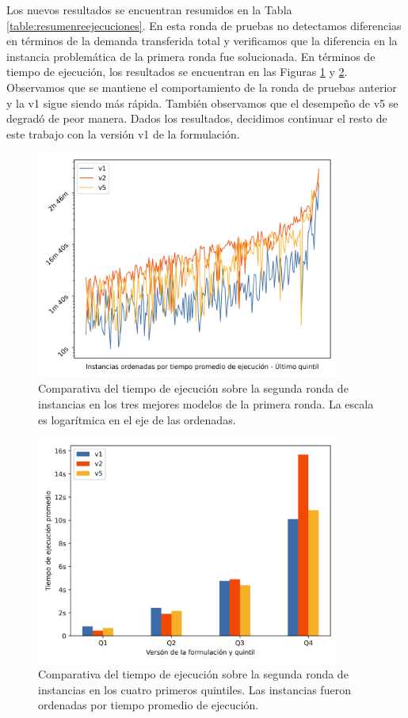 Los nuevos resultados se encuentran resumidos en la Tabla \ref{table:resumenreejecuciones}. En esta ronda de pruebas no detectamos diferencias en términos de la demanda transferida total y verificamos que la diferencia en la instancia problemática de la primera ronda fue solucionada. En términos de tiempo de ejecución, los resultados se encuentran en las Figuras \ref{fig:runtimecomparisonrerun} y \ref{fig:firstfourquintilesrerun}. Observamos que se mantiene el comportamiento de la ronda de pruebas anterior y la v1 sigue siendo más rápida. También observamos que el desempeño de v5 se degradó de peor manera. Dados los resultados, decidimos continuar el resto de este trabajo con la versión v1 de la formulación.

\begin{figure}[h!]
  \centering
  \includegraphics[width=10cm]{../resources/run_time_comparsion_rerun.png}
  \caption{Comparativa del tiempo de ejecución sobre la segunda ronda de instancias en los tres mejores modelos de la primera ronda. La escala es logarítmica en el eje de las ordenadas.} \label{fig:runtimecomparisonrerun}
\end{figure}

\begin{figure}[h!]
  \centering
  \includegraphics[width=10cm]{../resources/run_time_comparsion_by_quintile_rerun.png}
  \caption{Comparativa del tiempo de ejecución sobre la segunda ronda de instancias en los cuatro primeros quintiles. Las instancias fueron ordenadas por tiempo promedio de ejecución.} \label{fig:firstfourquintilesrerun}
\end{figure}


